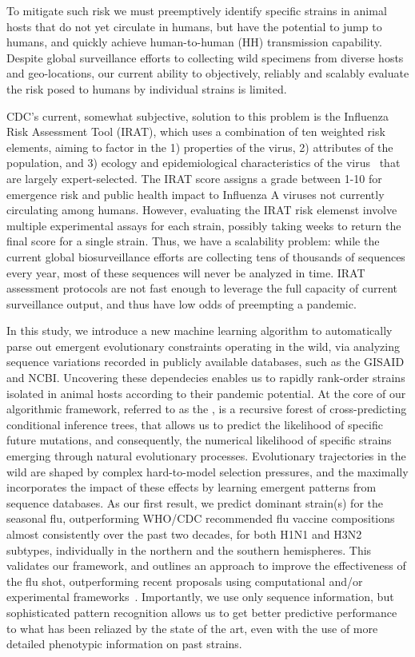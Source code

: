 \documentclass[onecolumn, compsoc,10pt]{IEEEtran}
\begin{document}
To mitigate such risk we must preemptively identify specific strains in animal hosts that do not yet circulate in humans, but   have the potential to  jump to humans, and quickly achieve human-to-human (HH) transmission capability. Despite global surveillance efforts to  collecting wild specimens from diverse hosts and geo-locations, our  current ability to objectively, reliably and scalably  evaluate the risk posed to  humans by  individual strains  is limited.

CDC's current, somewhat subjective, solution to this problem is the Influenza Risk Assessment Tool (IRAT), which  uses a combination of ten weighted risk elements, aiming to factor in the   1) properties of the virus, 2) attributes of the population, and 3) ecology and epidemiological characteristics of the virus~\cite{Influenz24:online} that are largely  expert-selected. The IRAT score assigns  a grade between 1-10 for emergence risk and public health impact to Influenza A viruses not currently circulating among humans. However, evaluating the IRAT risk elemenst  involve multiple experimental assays for each strain, possibly taking  weeks to return the final   score for a single strain. Thus, we have a scalability problem: while  the current global biosurveillance efforts are collecting tens of thousands of sequences every year, most of these sequences will never be analyzed in time. IRAT assessment protocols are  not fast enough to leverage the full capacity of current surveillance output, and thus have low odds of  preempting a pandemic.


In this study, we introduce a new machine learning algorithm to automatically parse out emergent evolutionary constraints operating in the wild, via analyzing sequence variations recorded in publicly available databases, such as the GISAID and NCBI. Uncovering these dependecies enables us  to rapidly rank-order strains isolated in animal hosts according to their pandemic potential. At the core of our algorithmic framework, referred to as the \enet, is a recursive forest of  cross-predicting conditional inference trees, that allows us to  predict the likelihood of specific future  mutations, and  consequently, the numerical likelihood of specific  strains emerging through natural evolutionary processes.
Evolutionary trajectories in the wild are shaped by complex hard-to-model selection pressures, and the \enet maximally incorporates the impact of these effects by  learning emergent patterns from sequence databases.
As our first result, we predict dominant strain(s) for the seasonal flu, outperforming  WHO/CDC recommended flu vaccine compositions almost consistently over the past two decades, for both H1N1 and H3N2 subtypes, individually in the northern and the southern hemispheres. This  validates our framework, and  outlines an approach to improve the effectiveness of the flu shot, outperforming  recent proposals using computational and/or experimental frameworks~\cite{huddleston2020integrating,neher2014predicting}.
Importantly, we use only sequence information, but sophisticated pattern recognition allows us to get better predictive performance to what has been reliazed by the state of the art, even with the use of more detailed phenotypic information on past strains.
\end{document}
